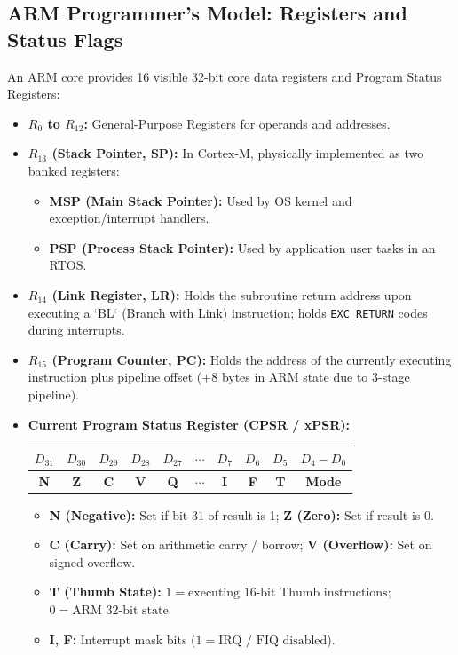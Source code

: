 \documentclass[12pt,a4paper]{article}
\begin{document}
\subsection{ARM Programmer's Model: Registers and Status Flags}
An ARM core provides 16 visible 32-bit core data registers and Program Status Registers:
\begin{itemize}[leftmargin=*]
  \item \textbf{$R_0$ to $R_{12}$:} General-Purpose Registers for operands and addresses.
  \item \textbf{$R_{13}$ (Stack Pointer, SP):} In Cortex-M, physically implemented as two banked registers:
  \begin{itemize}[leftmargin=*]
    \item \textbf{MSP (Main Stack Pointer):} Used by OS kernel and exception/interrupt handlers.
    \item \textbf{PSP (Process Stack Pointer):} Used by application user tasks in an RTOS.
  \end{itemize}
  \item \textbf{$R_{14}$ (Link Register, LR):} Holds the subroutine return address upon executing a `BL` (Branch with Link) instruction; holds \texttt{EXC\_RETURN} codes during interrupts.
  \item \textbf{$R_{15}$ (Program Counter, PC):} Holds the address of the currently executing instruction plus pipeline offset ($+8$ bytes in ARM state due to 3-stage pipeline).
  \item \textbf{Current Program Status Register (CPSR / xPSR):}
  \par\vspace{4pt}
  \centering
  \begin{tabular}{|c|c|c|c|c|c|c|c|c|c|}
  \hline
  \textbf{$D_{31}$} & \textbf{$D_{30}$} & \textbf{$D_{29}$} & \textbf{$D_{28}$} & \textbf{$D_{27}$} & $\cdots$ & \textbf{$D_7$} & \textbf{$D_6$} & \textbf{$D_5$} & \textbf{$D_{4}-D_0$} \\ \hline
  \textbf{N} & \textbf{Z} & \textbf{C} & \textbf{V} & \textbf{Q} & $\cdots$ & \textbf{I} & \textbf{F} & \textbf{T} & \textbf{Mode} \\ \hline
  \end{tabular}
  \par\vspace{4pt}\raggedright
  \begin{itemize}[leftmargin=*, itemsep=2pt]
    \item \textbf{N (Negative):} Set if bit 31 of result is 1; \textbf{Z (Zero):} Set if result is 0.
    \item \textbf{C (Carry):} Set on arithmetic carry / borrow; \textbf{V (Overflow):} Set on signed overflow.
    \item \textbf{T (Thumb State):} $1 = \text{executing 16-bit Thumb instructions}$; $0 = \text{ARM 32-bit state}$.
    \item \textbf{I, F:} Interrupt mask bits ($1 = \text{IRQ / FIQ disabled}$).
  \end{itemize}
\end{itemize}
\end{document}
